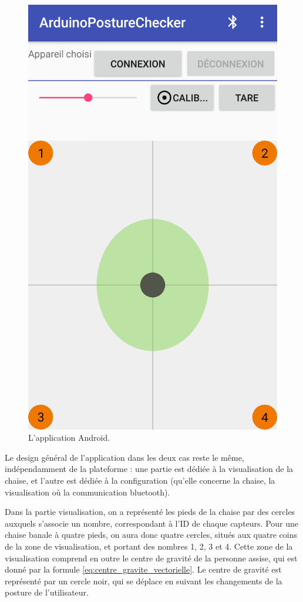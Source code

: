 \documentclass{polytech/polytech}
\begin{document}
\begin{figure}[htbp]
\begin{center}
\includegraphics[width=12cm]{image/screenshot_android1}
\end{center}
\caption{L'application Android.}
\label{fig:screenshot_android}
\end{figure}

Le design général de l'application dans les deux cas reste le même, indépendamment de la plateforme :  une partie est dédiée à la visualisation de la chaise, et l'autre est dédiée à la configuration (qu'elle concerne la chaise, la visualisation où la communication bluetooth). 

Dans la partie visualisation, on a représenté les pieds de la chaise par des cercles auxquels s'associe un nombre, correspondant à l'ID de chaque capteurs. Pour une chaise banale à quatre pieds, on aura donc quatre cercles, situés aux quatre coins de la zone de visualisation, et portant des nombres 1, 2, 3 et 4.
Cette zone de la visualisation comprend en outre le centre de gravité de la personne assise, qui est donné par la formule \eqref{eq:centre_gravite_vectorielle}. Le centre de gravité est représenté par un cercle noir, qui se déplace en suivant les changements de la posture de l'utilisateur.
\end{document}
